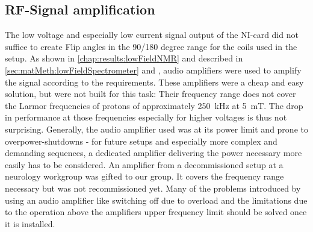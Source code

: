         \subsection{RF-Signal amplification}
        The low voltage and especially low current signal output of the NI-card did not suffice to create Flip angles in the 90/180 degree range for the coils used in the setup. As shown in \ref{chap:results:lowFieldNMR} and described in \ref{sec:matMeth:lowFieldSpectrometer} and \cite{borowiak_battery-driven_2013-1}, audio amplifiers were used to amplify the signal according to the requirements. These amplifiers were a cheap and easy solution, but were not built for this task: Their frequency range does not cover the Larmor frequencies of protons of approximately \SI{250}{\kilo\hertz} at \SI{5}{\milli\tesla}. The drop in performance at those frequencies especially for higher voltages is thus not surprising. Generally, the audio amplifier used was at its power limit and prone to overpower-shutdowns - for future setups and especially more complex and demanding sequences, a dedicated amplifier delivering the power necessary more easily has to be considered.
            An amplifier from a decommissioned setup at a neurology workgroup was gifted to our group. It covers the frequency range necessary but was not recommissioned yet. Many of the problems introduced by using an audio amplifier like switching off due to overload and the limitations due to the operation above the amplifiers upper frequency limit should be solved once it is installed.
